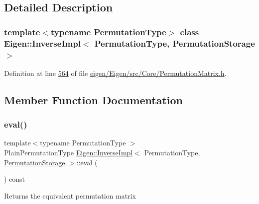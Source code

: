 \subsection{Detailed Description}
\subsubsection*{template$<$typename Permutation\+Type$>$\newline
class Eigen\+::\+Inverse\+Impl$<$ Permutation\+Type, Permutation\+Storage $>$}



Definition at line \hyperlink{eigen_2_eigen_2src_2_core_2_permutation_matrix_8h_source_l00564}{564} of file \hyperlink{eigen_2_eigen_2src_2_core_2_permutation_matrix_8h_source}{eigen/\+Eigen/src/\+Core/\+Permutation\+Matrix.\+h}.



\subsection{Member Function Documentation}
\mbox{\label{class_eigen_1_1_inverse_impl_3_01_permutation_type_00_01_permutation_storage_01_4_a9048319f60dc98831ddfd25a5f7d69a7}} 
\subsubsection{\texorpdfstring{eval()}{eval()}\hspace{0.1cm}{\footnotesize\ttfamily [1/2]}}
{\footnotesize\ttfamily template$<$typename Permutation\+Type $>$ \\
Plain\+Permutation\+Type \hyperlink{class_eigen_1_1_inverse_impl}{Eigen\+::\+Inverse\+Impl}$<$ Permutation\+Type, \hyperlink{struct_eigen_1_1_permutation_storage}{Permutation\+Storage} $>$\+::eval (\begin{DoxyParamCaption}{ }\end{DoxyParamCaption}) const\hspace{0.3cm}{\ttfamily [inline]}}

\begin{DoxyReturn}{Returns}
the equivalent permutation matrix 
\end{DoxyReturn}


